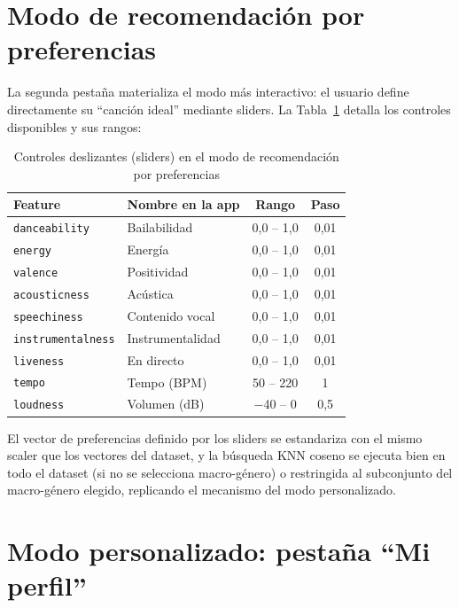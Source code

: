 \documentclass[12pt, a4paper]{book}
\theoremstyle{definition}
\begin{document}
\section{Modo de recomendación por preferencias}
\label{sec:modo_preferencias}

La segunda pestaña materializa el modo más interactivo: el usuario define
directamente su ``canción ideal'' mediante sliders. La Tabla~\ref{tab:sliders}
detalla los controles disponibles y sus rangos:

\begin{table}[H]
\centering
\caption{Controles deslizantes (sliders) en el modo de recomendación por preferencias}
\label{tab:sliders}
\small
\begin{tabular}{llcc}
\toprule
\textbf{Feature} & \textbf{Nombre en la app} & \textbf{Rango} & \textbf{Paso} \\
\midrule
\texttt{danceability}    & Bailabilidad         & 0{,}0 -- 1{,}0 & 0{,}01 \\
\texttt{energy}          & Energía              & 0{,}0 -- 1{,}0 & 0{,}01 \\
\texttt{valence}         & Positividad          & 0{,}0 -- 1{,}0 & 0{,}01 \\
\texttt{acousticness}    & Acústica             & 0{,}0 -- 1{,}0 & 0{,}01 \\
\texttt{speechiness}     & Contenido vocal      & 0{,}0 -- 1{,}0 & 0{,}01 \\
\texttt{instrumentalness}& Instrumentalidad     & 0{,}0 -- 1{,}0 & 0{,}01 \\
\texttt{liveness}        & En directo           & 0{,}0 -- 1{,}0 & 0{,}01 \\
\texttt{tempo}           & Tempo (BPM)          & 50 -- 220      & 1 \\
\texttt{loudness}        & Volumen (dB)         & $-$40 -- 0     & 0{,}5 \\
\bottomrule
\end{tabular}
\end{table}

El vector de preferencias definido por los sliders se estandariza con el
mismo scaler que los vectores del dataset, y la búsqueda KNN coseno se
ejecuta bien en todo el dataset (si no se selecciona macro-género) o
restringida al subconjunto del macro-género elegido, replicando el
mecanismo del modo personalizado.

\section{Modo personalizado: pestaña ``Mi perfil''}
\label{sec:tab_perfil}
\end{document}
